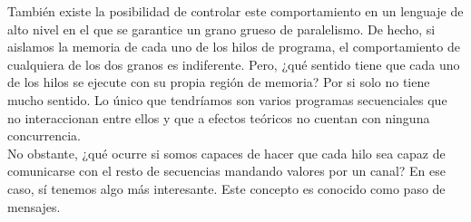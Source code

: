 También existe la posibilidad de controlar este comportamiento en un lenguaje de alto nivel en el que se garantice un grano grueso de paralelismo. De hecho, si aislamos la memoria de cada uno de los hilos de programa, el comportamiento de cualquiera de los dos granos es indiferente. Pero, ¿qué sentido tiene que cada uno de los hilos se ejecute con su propia región de memoria? Por si solo no tiene mucho sentido. Lo único que tendríamos son varios programas secuenciales que no interaccionan entre ellos y que a efectos teóricos no cuentan con ninguna concurrencia.\\

No obstante, ¿qué ocurre si somos capaces de hacer que cada hilo sea capaz de comunicarse con el resto de secuencias mandando valores por un canal? En ese caso, sí tenemos algo más interesante. Este concepto es conocido como paso de mensajes.\\
